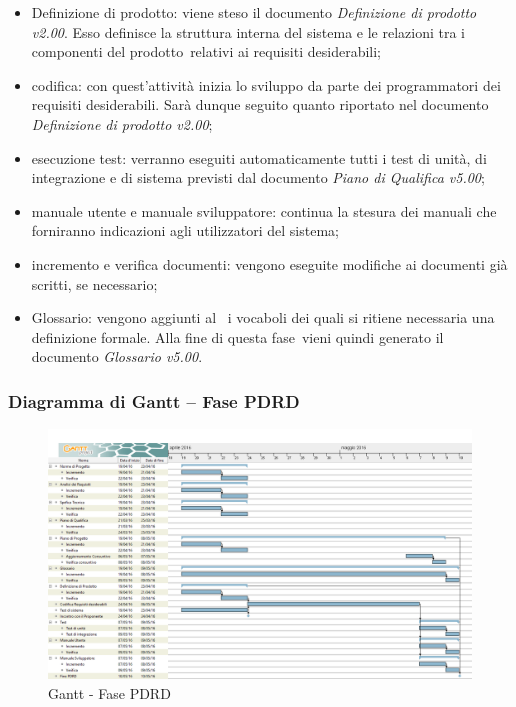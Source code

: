 \documentclass[../PianoProgetto.tex]{subfiles}
\begin{document}
		\begin{itemize}
			\item Definizione di prodotto: viene steso il documento \textit{Definizione di prodotto v2.00}. Esso definisce la struttura interna del sistema e le relazioni tra i componenti del prodotto\g\ relativi ai requisiti desiderabili;

			\item codifica: con quest'attività inizia lo sviluppo da parte dei programmatori dei requisiti desiderabili. Sarà dunque seguito quanto riportato nel documento \textit{Definizione di prodotto v2.00};

	 		\item esecuzione test: verranno eseguiti automaticamente tutti i test di unità, di integrazione e di sistema previsti dal documento \textit{Piano di Qualifica v5.00};

			\item manuale utente e manuale sviluppatore: continua la stesura dei manuali che forniranno indicazioni agli utilizzatori del sistema;

			\item incremento e verifica documenti: vengono eseguite modifiche ai documenti già scritti, se necessario;

			\item Glossario: vengono aggiunti al \glossario\ i vocaboli dei quali si ritiene necessaria una definizione formale. Alla fine di questa fase\g\ vieni quindi generato il documento \textit{Glossario v5.00}.
		\end{itemize}
		\newpage
		\subsubsection{Diagramma di Gantt – Fase PDRD}
			\begin{figure}[!h]
				\centering
				\includegraphics[width=\textwidth]{gantt_png/5-requisiti_desiderabili}
				\caption{Gantt - Fase PDRD}
				\label{fig:Gantt - Fase PDRD}
			\end{figure}
			
\end{document}
